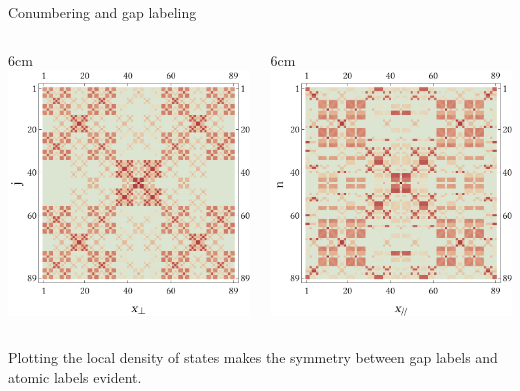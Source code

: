 \documentclass[xcolor=x11names,compress,professionalfonts]{beamer}
\renewcommand{\(}{\begin{columns}}
\renewcommand{\)}{\end{columns}}
\newcommand{\<}[1]{\begin{column}{#1}}
\renewcommand{\>}{\end{column}}
\begin{document}
\begin{frame}{Conumbering and gap labeling}
\(
\<{6cm}
\centering
\includegraphics[scale=0.4]{img/ldos_reordered_conumbering.pdf}
\>

\<{6cm}
\centering
\includegraphics[scale=0.4]{img/ldos_reordered_numbering.pdf}
\>
\)

Plotting the local density of states makes the symmetry between gap labels and atomic labels evident.
\end{frame}
\end{document}
